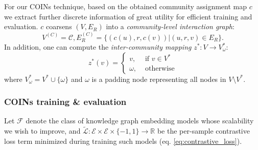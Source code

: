 
For our COINs technique, based on the obtained community assignment map $c$ we extract further discrete information of great utility for efficient training and evaluation. $c$ coarsens $(V, E_R)$ into a \emph{community-level interaction graph}: $$V^{(C)} = \mathcal{C}, E^{(C)}_R = \{(c(u),r,c(v))|(u,r,v) \in E_R\}.$$%
In addition, one can compute the \emph{inter-community mapping} $z^*: V \to V_{\omega}^*$:
$$z^*(v)=\begin{cases} v, & \text{ if } v \in V^* \\ \omega, & \text{ otherwise} \end{cases}$$where $V_{\omega}^* = V^* \cup \{\omega\}$ and $\omega$ is a padding node representing all nodes in $V \setminus V^*$.

\subsubsection{COINs training \& evaluation}


Let $\mathcal{F}$ denote the class of knowledge graph embedding models whose scalability we wish to improve, and $\tilde{\mathcal{L}}: \mathcal{E} \times \mathcal{E} \times \{-1,1\} \to \mathbb{R}$ be the per-sample contrastive loss term minimized during training such models (eq. \eqref{eq:contrastive_loss}). 

